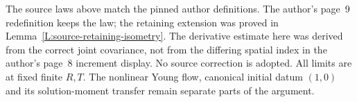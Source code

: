 The source laws above match the pinned author definitions. The author's
page~9 redefinition keeps the law; the retaining extension was proved in
Lemma~\ref{L:source-retaining-isometry}. The derivative estimate here was
derived from the correct joint covariance, not from the differing spatial
index in the author's page~8 increment display. No source correction is
adopted. All limits are at fixed finite $R,T$. The nonlinear Young flow,
canonical initial datum $(1,0)$ and its solution-moment transfer remain
separate parts of the argument.
